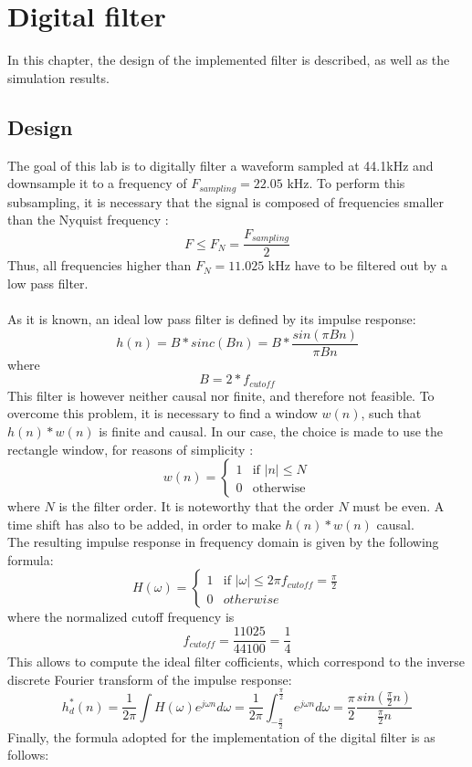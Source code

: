\chapter{Digital filter}

In this chapter, the design of the implemented filter is described, as well as the simulation results.

\section{Design}

The goal of this lab is to digitally filter a waveform sampled at 44.1kHz and downsample it to a frequency of $F_{sampling}=22.05$ kHz. To perform this subsampling, it is necessary that the signal is composed of frequencies smaller than the Nyquist frequency : 
\[ F \le F_N = \frac{F_{sampling}}{2} \] 
Thus, all frequencies higher than $ F_N = 11.025$ kHz have to be filtered out by a low pass filter.\\
\\
As it is known, an ideal low pass filter is defined by its impulse response: 
\[ h(n) = B*sinc(Bn) = B * \frac{sin(\pi Bn)}{\pi Bn} \] where \[B = 2*f_{cutoff}\]
This filter is however neither causal nor finite, and therefore not feasible. To overcome this problem, it is necessary to find a window $w(n)$, such that $h(n)*w(n)$ is finite and causal. In our case, the choice is made to use the rectangle window, for reasons of simplicity : \[ w(n) = \left\{
\begin{array}{ll}
1 & \mbox{if } \vert n \vert  \le N\\
0 & \mbox{otherwise}
\end{array}
\right. \]
where $N$ is the filter order. It is noteworthy that the order $N$ must be even. A time shift has also to be added, in order to make $h(n)*w(n)$ causal. \\
The resulting impulse response in frequency domain is given by the following formula:
\[
H(\omega) = \left\{ 
	\begin{array}{ll}
	1 & \mbox{if } \vert \omega \vert \le 2 \pi f_{cutoff} = \frac{\pi}{2}\\
	0 & otherwise
	\end{array}
	\right.
\]
where the normalized cutoff frequency is \[f_{cutoff} = \frac{11025}{44100} = \frac{1}{4}\]
This allows to compute the ideal filter cofficients, which correspond to the inverse discrete Fourier transform of the impulse response:
\[
h_d^*(n) = \frac{1}{2\pi} \int H(\omega) e^{j\omega n} d\omega = \frac{1}{2\pi} \int_{-\frac{\pi}{2}}^{\frac{\pi}{2}} e^{j \omega n} d\omega = \frac{\pi}{2}  \frac{sin(\frac{\pi}{2} n)}{\frac{\pi}{2} n}
\]
Finally, the formula adopted for the implementation of the digital filter is as follows:

